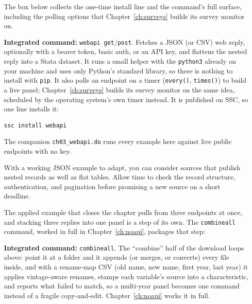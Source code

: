 \documentclass[
    a4paper,
    fontsize=10pt,
    twoside=true,
    numbers=noenddot,
]{kaobook}
\begin{document}
The box below collects the one-time install line and the command's full surface, including the polling options that Chapter~\ref{ch:surveys} builds its survey monitor on.

\begin{kaobox}[frametitle=Package Integration: \texttt{webapi}]
\textbf{Integrated command:} \texttt{webapi get}/\texttt{post}. Fetches a JSON (or CSV) web reply, optionally with a bearer token, basic auth, or an API key, and flattens the nested reply into a Stata dataset. It runs a small helper with the \texttt{python3} already on your machine and uses only Python's standard library, so there is nothing to install with \texttt{pip}. It also polls an endpoint on a timer (\texttt{every()}, \texttt{times()}) to build a live panel; Chapter~\ref{ch:surveys} builds its survey monitor on the same idea, scheduled by the operating system's own timer instead. It is published on SSC, so one line installs it:
\par
{\footnotesize
\begin{verbatim}
ssc install webapi
\end{verbatim}
}
The companion \texttt{ch03\_webapi.do} runs every example here against live public endpoints with no key.
\end{kaobox}

With a working JSON example to adapt, you can consider sources that publish nested records as well as flat tables. Allow time to check the record structure, authentication, and pagination before promising a new source on a short deadline.

The applied example that closes the chapter pulls from three endpoints at once, and stacking three replies into one panel is a step of its own. The \texttt{combineall} command, worked in full in Chapter~\ref{ch:noapi}, packages that step:

\begin{kaobox}[frametitle=Package Integration: \texttt{combineall}]
\textbf{Integrated command:} \texttt{combineall}. The \enquote{combine} half of the download loops above: point it at a folder and it appends (or merges, or converts) every file inside, and with a rename-map CSV (old name, new name, first year, last year) it applies vintage-aware renames, stamps each variable's source into a characteristic, and reports what failed to match, so a multi-year panel becomes one command instead of a fragile copy-and-edit. Chapter~\ref{ch:noapi} works it in full.
\end{kaobox}
\end{document}
